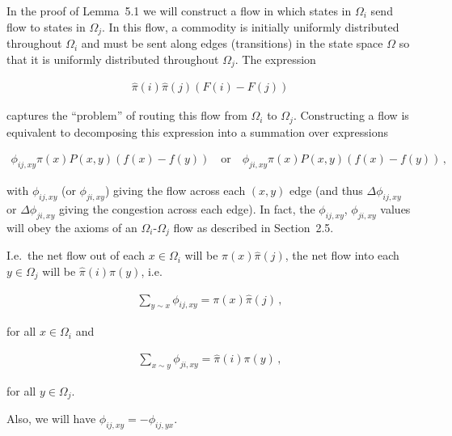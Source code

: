 In the proof of Lemma 5.1 we will construct a flow in which states in $\Omega_{i}$ send flow to states in $\Omega_{j}$. In this flow, a commodity is initially uniformly distributed throughout $\Omega_{i}$ and must be sent along edges (transitions) in the state space $\Omega$ so that it is uniformly distributed throughout $\Omega_{j}$. The expression\par


\[\begin{gathered}
\hat{\pi}(i)\hat{\pi}(j)(F(i)-F(j))
\end{gathered}\]


captures the “problem” of routing this flow from $\Omega_{i}$ to $\Omega_{j}$. Constructing a flow is equivalent to decomposing this expression into a summation over expressions\par


\[\begin{gathered}
\phi_{ij,xy}\pi(x)P(x,y)(f(x)-f(y))\quad\textrm{or}\quad\phi_{ji,xy}\pi(x)P(x,y)(f(x)-f(y))\,,
\end{gathered}\]




with $\phi_{ij,xy}$ (or $\phi_{ji,xy}$) giving the flow across each $(x,y)$ edge (and thus $\Delta\phi_{ij,xy}$ or $\Delta\phi_{ji,xy}$ giving the congestion across each edge). In fact, the $\phi_{ij,xy}$, $\phi_{ji,xy}$ values will obey the axioms of an $\Omega_{i}$-$\Omega_{j}$ flow as described in Section 2.5.\par




I.e. the net flow out of each $x\in\Omega_{i}$ will be $\pi(x)\hat{\pi}(j)$, the net flow into each $y\in\Omega_{j}$ will be $\hat{\pi}(i)\pi(y)$, i.e.\par


\[\begin{gathered}
\sum_{y\sim x}\phi_{ij,xy}=\pi(x)\hat{\pi}(j)\,,
\end{gathered}\]


for all $x\in\Omega_{i}$
and\par


\[\begin{gathered}
\sum_{x\sim y}\phi_{ji,xy}=\hat{\pi}(i)\pi(y)\,,
\end{gathered}\]


for all $y\in\Omega_{j}$.\par




Also, we will have $\phi_{ij,xy}=-\phi_{ij,yx}$.\par




